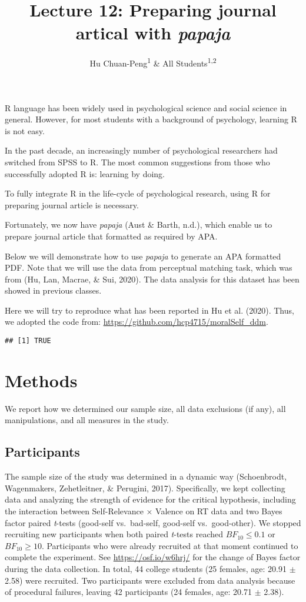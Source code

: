 \documentclass[
  man]{apa6}
\title{Lecture 12: Preparing journal artical with \emph{papaja}}
\author{Hu Chuan-Peng\textsuperscript{1} \& All Students\textsuperscript{1,2}}
\date{}
\affiliation{\vspace{0.5cm}\textsuperscript{1} Nanjing Normal Unviersity\\\textsuperscript{2} Collaborators' Affiliations}
\begin{document}
\maketitle

R language has been widely used in psychological science and social science in general. However, for most students with a background of psychology, learning R is not easy.

In the past decade, an increasingly number of psychological researchers had switched from SPSS to R. The most common suggestions from those who successfully adopted R is: learning by doing.

To fully integrate R in the life-cycle of psychological research, using R for preparing journal article is necessary.

Fortunately, we now have \emph{papaja} (Aust \& Barth, n.d.), which enable us to prepare journal article that formatted as required by APA.

Below we will demonstrate how to use \emph{papaja} to generate an APA formatted PDF. Note that we will use the data from perceptual matching task, which was from (Hu, Lan, Macrae, \& Sui, 2020). The data analysis for this dataset has been showed in previous classes.

Here we will try to reproduce what has been reported in Hu et al. (2020). Thus, we adopted the code from: \url{https://github.com/hcp4715/moralSelf_ddm}.

\begin{verbatim}
## [1] TRUE
\end{verbatim}

\hypertarget{methods}{%
\section{Methods}\label{methods}}

We report how we determined our sample size, all data exclusions (if any), all manipulations, and all measures in the study.

\hypertarget{participants}{%
\subsection{Participants}\label{participants}}

The sample size of the study was determined in a dynamic way (Schoenbrodt, Wagenmakers, Zehetleitner, \& Perugini, 2017). Specifically, we kept collecting data and analyzing the strength of evidence for the critical hypothesis, including the interaction between Self-Relevance × Valence on RT data and two Bayes factor paired \emph{t}-tests (good-self vs.~bad-self, good-self vs.~good-other). We stopped recruiting new participants when both paired \emph{t}-tests reached \(BF_{10} \le 0.1\) or \(BF_{10} \ge 10\). Participants who were already recruited at that moment continued to complete the experiment. See \url{https://osf.io/w6hrj/} for the change of Bayes factor during the data collection. In total, 44 college students (25 females, age: 20.91 \(\pm\) 2.58) were recruited. Two participants were excluded from data analysis because of procedural failures, leaving 42 participants (24 females, age: 20.71 \(\pm\) 2.38).
\end{document}
